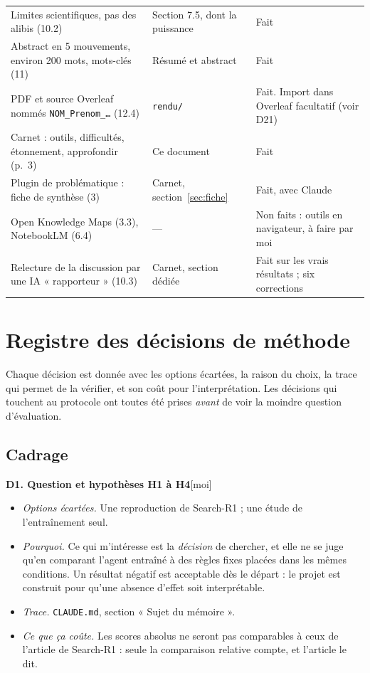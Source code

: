 \documentclass[10pt,a4paper]{article}
\newcommand{\f}[1]{\texttt{\small #1}}
\newcommand{\moi}{\textcolor{green!45!black}{\textsf{\small[moi]}}}
\begin{document}
\begin{longtable}{@{}P{5.2cm}P{6.2cm}P{4.2cm}@{}}
Limites scientifiques, pas des alibis (10.2) & Section 7.5, dont la puissance & Fait\\
Abstract en 5 mouvements, environ 200 mots, mots-clés (11) & Résumé et abstract & Fait\\
PDF et source Overleaf nommés \f{NOM\_Prenom\_…} (12.4) & \f{rendu/} & Fait. Import dans Overleaf facultatif (voir D21)\\
Carnet : outils, difficultés, étonnement, approfondir (p.~3) & Ce document & Fait\\
Plugin de problématique : fiche de synthèse (3) & Carnet, section~\ref{sec:fiche} & Fait, avec Claude\\
Open Knowledge Maps (3.3), NotebookLM (6.4) & — & Non faits : outils en navigateur, à faire par moi\\
Relecture de la discussion par une IA « rapporteur » (10.3) & Carnet, section dédiée & Fait sur les vrais résultats ; six corrections\\
\bottomrule
\end{longtable}
\normalsize

\section{Registre des décisions de méthode}\label{sec:registre}

Chaque décision est donnée avec les options écartées, la raison du choix, la trace qui permet de la vérifier, et son coût pour l'interprétation. Les décisions qui touchent au protocole ont toutes été prises \emph{avant} de voir la moindre question d'évaluation.

\newcommand{\dec}[6]{\par\medskip\noindent\textbf{#1}\quad #2\par
\begin{itemize}
\item \emph{Options écartées.} #3
\item \emph{Pourquoi.} #4
\item \emph{Trace.} #5
\item \emph{Ce que ça coûte.} #6
\end{itemize}}

\subsection*{Cadrage}

\dec{D1. Question et hypothèses H1 à H4}{\moi}
{Une reproduction de Search-R1 ; une étude de l'entraînement seul.}
{Ce qui m'intéresse est la \emph{décision} de chercher, et elle ne se juge qu'en comparant l'agent entraîné à des règles fixes placées dans les mêmes conditions. Un résultat négatif est acceptable dès le départ : le projet est construit pour qu'une absence d'effet soit interprétable.}
{\f{CLAUDE.md}, section « Sujet du mémoire ».}
{Les scores absolus ne seront pas comparables à ceux de l'article de Search-R1 : seule la comparaison relative compte, et l'article le dit.}
\end{document}
